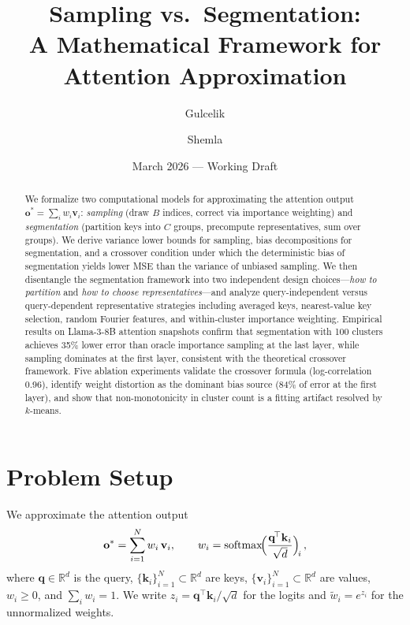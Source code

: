 \documentclass[11pt,a4paper]{article}
\title{Sampling vs.\ Segmentation:\\
A Mathematical Framework for Attention Approximation}
\author{Gulcelik \and Shemla}
\date{March 2026 — Working Draft}
\theoremstyle{definition}
\newcommand{\vv}{\mathbf{v}}
\newcommand{\kk}{\mathbf{k}}
\newcommand{\qq}{\mathbf{q}}
\newcommand{\oo}{\mathbf{o}}
\newcommand{\softmax}{\mathrm{softmax}}
\begin{document}
\maketitle

\begin{abstract}
We formalize two computational models for approximating the attention output
$\oo^{*}=\sum_{i}w_{i}\vv_{i}$: \emph{sampling} (draw $B$ indices, correct
via importance weighting) and \emph{segmentation} (partition keys into $C$
groups, precompute representatives, sum over groups).  We derive variance
lower bounds for sampling, bias decompositions for segmentation, and a
crossover condition under which the deterministic bias of segmentation yields
lower MSE than the variance of unbiased sampling.  We then disentangle the
segmentation framework into two independent design choices---\emph{how to
partition} and \emph{how to choose representatives}---and analyze query-independent
versus query-dependent representative strategies including averaged keys,
nearest-value key selection, random Fourier features, and within-cluster
importance weighting.  Empirical
results on Llama-3-8B attention snapshots confirm that segmentation with 100
clusters achieves 35\% lower error than oracle importance sampling at the last
layer, while sampling dominates at the first layer, consistent with the
theoretical crossover framework.
Five ablation experiments validate the crossover formula (log-correlation 0.96),
identify weight distortion as the dominant bias source (84\% of error at the
first layer), and show that non-monotonicity in cluster count is a fitting
artifact resolved by $k$-means.
\end{abstract}

\tableofcontents
\newpage

\section{Problem Setup}\label{sec:setup}

We approximate the attention output
\begin{equation}\label{eq:attention}
  \oo^{*}
  = \sum_{i=1}^{N} w_i\,\vv_i,
  \qquad
  w_i = \softmax\!\Bigl(\frac{\qq^{\!\top}\kk_i}{\sqrt{d}}\Bigr)_{\!i}\,,
\end{equation}
where $\qq\in\mathbb{R}^{d}$ is the query,
$\{\kk_i\}_{i=1}^{N}\subset\mathbb{R}^{d}$ are keys,
$\{\vv_i\}_{i=1}^{N}\subset\mathbb{R}^{d}$ are values,
$w_i\ge0$, and $\sum_{i}w_i=1$.
We write $z_i = \qq^{\!\top}\kk_i/\sqrt{d}$ for the logits and
$\tilde{w}_i = e^{z_i}$ for the unnormalized weights.
\end{document}
